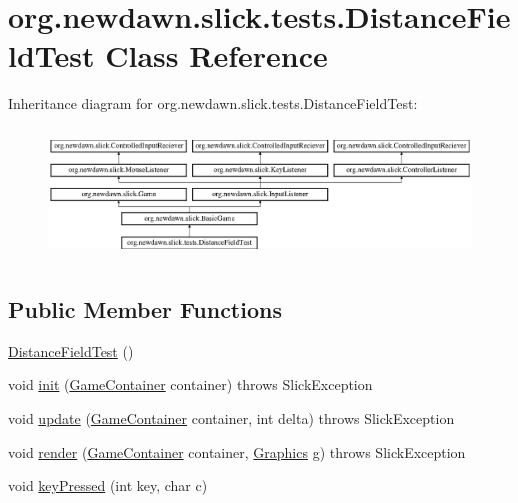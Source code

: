 \hypertarget{classorg_1_1newdawn_1_1slick_1_1tests_1_1_distance_field_test}{}\section{org.\+newdawn.\+slick.\+tests.\+Distance\+Field\+Test Class Reference}
\label{classorg_1_1newdawn_1_1slick_1_1tests_1_1_distance_field_test}
Inheritance diagram for org.\+newdawn.\+slick.\+tests.\+Distance\+Field\+Test\+:\begin{figure}[H]
\begin{center}
\leavevmode
\includegraphics[height=3.522012cm]{classorg_1_1newdawn_1_1slick_1_1tests_1_1_distance_field_test}
\end{center}
\end{figure}
\subsection*{Public Member Functions}
\begin{DoxyCompactItemize}
\item 
\mbox{\hyperlink{classorg_1_1newdawn_1_1slick_1_1tests_1_1_distance_field_test_ad3b228a30e9c9e57f56af37e0c44cf04}{Distance\+Field\+Test}} ()
\item 
void \mbox{\hyperlink{classorg_1_1newdawn_1_1slick_1_1tests_1_1_distance_field_test_a1179a4d943fc72536ec70f48b83d99fc}{init}} (\mbox{\hyperlink{classorg_1_1newdawn_1_1slick_1_1_game_container}{Game\+Container}} container)  throws Slick\+Exception 
\item 
void \mbox{\hyperlink{classorg_1_1newdawn_1_1slick_1_1tests_1_1_distance_field_test_a7042da06a8ba286741d9bb230f6ad9fa}{update}} (\mbox{\hyperlink{classorg_1_1newdawn_1_1slick_1_1_game_container}{Game\+Container}} container, int delta)  throws Slick\+Exception 
\item 
void \mbox{\hyperlink{classorg_1_1newdawn_1_1slick_1_1tests_1_1_distance_field_test_a4ea78be9228beb985a86a6cf01d14795}{render}} (\mbox{\hyperlink{classorg_1_1newdawn_1_1slick_1_1_game_container}{Game\+Container}} container, \mbox{\hyperlink{classorg_1_1newdawn_1_1slick_1_1_graphics}{Graphics}} g)  throws Slick\+Exception 
\item 
void \mbox{\hyperlink{classorg_1_1newdawn_1_1slick_1_1tests_1_1_distance_field_test_ada9839e97d2d42dca5e14cc437c38348}{key\+Pressed}} (int key, char c)
\end{DoxyCompactItemize}
